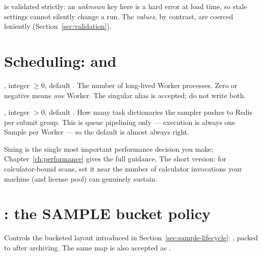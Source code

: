 \begin{jwarn}
 is validated strictly: an \emph{unknown} key here is a hard error at
load time, so stale settings cannot silently change a run. The \emph{values}, by
contrast, are coerced leniently (Section~\ref{sec:validation}).
\end{jwarn}

\section{Scheduling:  and }
\label{sec:workers}

\begin{keylist}
  \item[workers] \opt, integer $\geq 0$, default . The number of long-lived
        Worker processes. Zero or negative means \emph{one} Worker. The singular alias
         is accepted; do not write both.
  \item[batch\_size] \opt, integer $> 0$, default . How many task
        dictionaries the sampler pushes to Redis per submit group. This is queue
        pipelining only --- execution is always one Sample per Worker --- so the default
        is almost always right.
\end{keylist}

Sizing  is the single most important performance decision you make;
Chapter~\ref{ch:performance} gives the full guidance. The short version: for
calculator-bound scans, set it near the number of calculator invocations your machine (and
license pool) can genuinely sustain.

\section{: the SAMPLE bucket policy}
\label{sec:sample-directory}

Controls the bucketed layout introduced in Section~\ref{sec:sample-lifecycle}:
, packed to  after archiving. The
same map is also accepted as .

